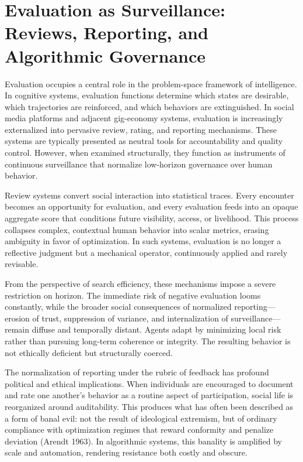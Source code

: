 \documentclass[12pt]{article}
\begin{document}
\section{Evaluation as Surveillance: Reviews, Reporting, and Algorithmic Governance}

Evaluation occupies a central role in the problem-space framework of intelligence. In cognitive systems, evaluation functions determine which states are desirable, which trajectories are reinforced, and which behaviors are extinguished. In social media platforms and adjacent gig-economy systems, evaluation is increasingly externalized into pervasive review, rating, and reporting mechanisms. These systems are typically presented as neutral tools for accountability and quality control. However, when examined structurally, they function as instruments of continuous surveillance that normalize low-horizon governance over human behavior.

Review systems convert social interaction into statistical traces. Every encounter becomes an opportunity for evaluation, and every evaluation feeds into an opaque aggregate score that conditions future visibility, access, or livelihood. This process collapses complex, contextual human behavior into scalar metrics, erasing ambiguity in favor of optimization. In such systems, evaluation is no longer a reflective judgment but a mechanical operator, continuously applied and rarely revisable.

From the perspective of search efficiency, these mechanisms impose a severe restriction on horizon. The immediate risk of negative evaluation looms constantly, while the broader social consequences of normalized reporting—erosion of trust, suppression of variance, and internalization of surveillance—remain diffuse and temporally distant. Agents adapt by minimizing local risk rather than pursuing long-term coherence or integrity. The resulting behavior is not ethically deficient but structurally coerced.

The normalization of reporting under the rubric of feedback has profound political and ethical implications. When individuals are encouraged to document and rate one another’s behavior as a routine aspect of participation, social life is reorganized around auditability. This produces what has often been described as a form of banal evil: not the result of ideological extremism, but of ordinary compliance with optimization regimes that reward conformity and penalize deviation (Arendt 1963). In algorithmic systems, this banality is amplified by scale and automation, rendering resistance both costly and obscure.
\end{document}
